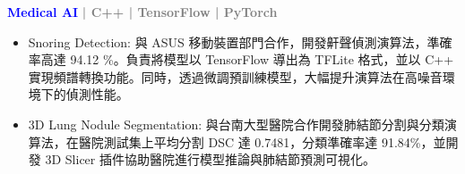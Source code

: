 \begin{cventries}
{\begin{cvitems}
\begin{itemize}
        \end{itemize}
        \item \textbf{\textcolor{blue}{Medical AI}} \textbf{\textcolor{gray}{| C++ | TensorFlow | PyTorch}}
        \begin{itemize}
            \item Snoring Detection: 與 ASUS 移動裝置部門合作，開發鼾聲偵測演算法，準確率高達 94.12 \%。負責將模型以 TensorFlow 導出為 TFLite 格式，並以 C++ 實現頻譜轉換功能。同時，透過微調預訓練模型，大幅提升演算法在高噪音環境下的偵測性能。
        \end{itemize}
        \begin{itemize}
            \item 3D Lung Nodule Segmentation: 與台南大型醫院合作開發肺結節分割與分類演算法，在醫院測試集上平均分割 DSC 達 0.7481，分類準確率達 91.84\%，並開發 3D Slicer 插件協助醫院進行模型推論與肺結節預測可視化。
        \end{itemize}
      \end{cvitems}
    }


\end{cventries}
